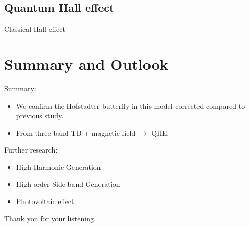 \documentclass[aspectratio=169]{beamer}
\begin{document}
	\subsection{Quantum Hall effect}
	\begin{frame}{Classical Hall effect}
	\end{frame}
	\section{Summary and Outlook}
	\begin{frame}
		\begin{block}{Summary:}
			\begin{itemize}
				\item We confirm the Hofstadter butterfly in this model corrected compared to previous study.\\
				\item From three-band TB + magnetic field $\to$ QHE.
			\end{itemize}
		\end{block}
		\begin{exampleblock}{Further research:}
			\begin{itemize}
				\item High Harmonic Generation
				\item High-order Side-band Generation
				\item Photovoltaic effect
			\end{itemize}
		\end{exampleblock}
		\begin{multicols}{2}
			\begin{center}
				\null\vfill
				Thank you for your listening.
				\null\vfill
			\end{center}\columnbreak
		\end{multicols}
	\end{frame}
\end{document}
